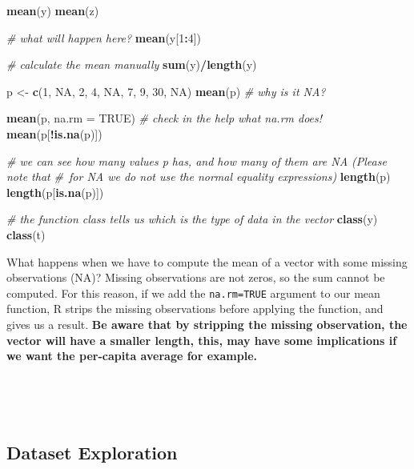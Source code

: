 \documentclass[
]{article}
\newenvironment{Shaded}{\begin{snugshade}}{\end{snugshade}}
\newcommand{\AttributeTok}[1]{\textcolor[rgb]{0.13,0.29,0.53}{#1}}
\newcommand{\CommentTok}[1]{\textcolor[rgb]{0.56,0.35,0.01}{\textit{#1}}}
\newcommand{\ConstantTok}[1]{\textcolor[rgb]{0.56,0.35,0.01}{#1}}
\newcommand{\DecValTok}[1]{\textcolor[rgb]{0.00,0.00,0.81}{#1}}
\newcommand{\FunctionTok}[1]{\textcolor[rgb]{0.13,0.29,0.53}{\textbf{#1}}}
\newcommand{\NormalTok}[1]{#1}
\newcommand{\OtherTok}[1]{\textcolor[rgb]{0.56,0.35,0.01}{#1}}
\newcommand{\SpecialCharTok}[1]{\textcolor[rgb]{0.81,0.36,0.00}{\textbf{#1}}}
\begin{document}
\begin{Shaded}
\begin{Highlighting}[]
\FunctionTok{mean}\NormalTok{(y)}
\FunctionTok{mean}\NormalTok{(z)}

\CommentTok{\# what will happen here?}
\FunctionTok{mean}\NormalTok{(y[}\DecValTok{1}\SpecialCharTok{:}\DecValTok{4}\NormalTok{])}

\CommentTok{\# calculate the mean manually}
\FunctionTok{sum}\NormalTok{(y)}\SpecialCharTok{/}\FunctionTok{length}\NormalTok{(y)}

\NormalTok{p }\OtherTok{\textless{}{-}} \FunctionTok{c}\NormalTok{(}\DecValTok{1}\NormalTok{, }\ConstantTok{NA}\NormalTok{, }\DecValTok{2}\NormalTok{, }\DecValTok{4}\NormalTok{, }\ConstantTok{NA}\NormalTok{, }\DecValTok{7}\NormalTok{, }\DecValTok{9}\NormalTok{, }\DecValTok{30}\NormalTok{, }\ConstantTok{NA}\NormalTok{)}
\FunctionTok{mean}\NormalTok{(p)}
\CommentTok{\# why is it NA?}

\FunctionTok{mean}\NormalTok{(p, }\AttributeTok{na.rm =} \ConstantTok{TRUE}\NormalTok{)}
\CommentTok{\# check in the help what na.rm does!}
\FunctionTok{mean}\NormalTok{(p[}\SpecialCharTok{!}\FunctionTok{is.na}\NormalTok{(p)])}

\CommentTok{\# we can see how many values p has, and how many of them are NA (Please note that }
\CommentTok{\# for NA we do not use the normal equality expressions)}
\FunctionTok{length}\NormalTok{(p)}
\FunctionTok{length}\NormalTok{(p[}\FunctionTok{is.na}\NormalTok{(p)])}

\CommentTok{\# the function class tells us which is the type of data in the vector}
\FunctionTok{class}\NormalTok{(y)}
\FunctionTok{class}\NormalTok{(t)}
\end{Highlighting}
\end{Shaded}

What happens when we have to compute the mean of a vector with some
missing observations (NA)? Missing observations are not zeros, so the
sum cannot be computed. For this reason, if we add the \texttt{na.rm=TRUE}
argument to our mean function, R strips the missing observations before
applying the function, and gives us a result. \textbf{Be aware that by
stripping the missing observation, the vector will have a smaller
length, this, may have some implications if we want the per-capita
average for example.}

~

~

\hypertarget{dataset-exploration}{%
\subsection{Dataset Exploration}\label{dataset-exploration}}
\end{document}
